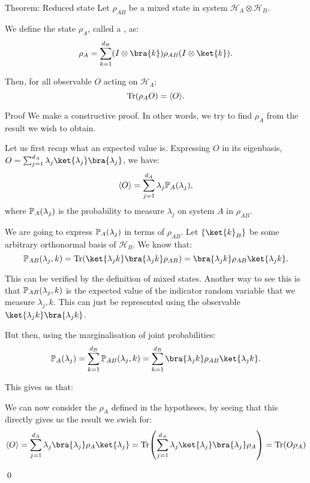 \documentclass[a4paper]{article}
\begin{document}
\begin{parag}{Theorem: Reduced state}
    Let $\rho_{AB}$ be a mixed state in system $\mathcal{H}_A \otimes \mathcal{H}_B$.

    We define the state $\rho_A$, called a , as: 
    \[\rho_A = \sum_{k=1}^{d_B} \left(I \otimes \bra{k}\right) \rho_{AB} \left(I \otimes \ket{k}\right).\]

    Then, for all observable $O$ acting on $\mathcal{H}_A$: 
    \[\Tr\left(\rho_A O\right) = \left\langle O \right\rangle.\]
    
    \begin{subparag}{Proof}
        We make a constructive proof. In other words, we try to find $\rho_A$ from the result we wish to obtain.

        Let us first recap what an expected value is. Expressing $O$ in its eigenbasis, $O = \sum_{j=1}^{d_A} \lambda_j \ket{\lambda_j}\bra{\lambda_j}$, we have:
        \[\left\langle O \right\rangle = \sum_{j=1}^{d_A} \lambda_j \prob_A\left(\lambda_j\right),\]
        where $\prob_A\left(\lambda_j\right)$ is the probability to measure $\lambda_j$ on system $A$ in $\rho_{AB}$.

        We are going to express $\prob_A\left(\lambda_j\right)$ in terms of $\rho_{AB}$. Let $\left\{\ket{k}_B\right\}$ be some arbitrary orthonormal basis of $\mathcal{H}_B$. We know that:
        \[\prob_{AB}\left(\lambda_j, k\right) = \Tr\left(\ket{\lambda_j k}\bra{\lambda_j k} \rho_{AB}\right) = \bra{\lambda_j k} \rho_{AB} \ket{\lambda_j k}.\]

        This can be verified by the definition of mixed states. Another way to see this is that $\prob_{AB}\left(\lambda_j, k\right)$ is the expected value of the indicator random variable that we measure $\lambda_j, k$. This can just be represented using the observable $\ket{\lambda_j k}\bra{\lambda_j k}$.

        But then, using the marginalisation of joint probabilities: 
        \[\prob_A\left(\lambda_j\right) = \sum_{k=1}^{d_B} \prob_{AB}\left(\lambda_j, k\right) = \sum_{k=1}^{d_B} \bra{\lambda_j k} \rho_{AB} \ket{\lambda_j k}.\]

        This gives us that:

        We can now consider the $\rho_A$ defined in the hypotheses, by seeing that this directly gives us the result we swish for:
        \[\left\langle O \right\rangle = \sum_{j=1}^{d_A} \lambda_j \bra{\lambda_j} \rho_A \ket{\lambda_j} = \Tr\left(\sum_{j=1}^{d_A} \lambda_j \ket{\lambda_j}\bra{\lambda_j} \rho_A\right) = \Tr\left(O \rho_A\right)\]

        \qed
    \end{subparag}
\end{parag}
\end{document}
